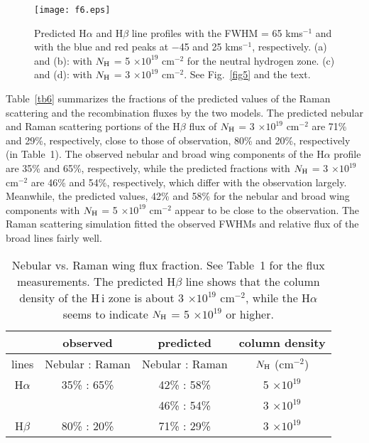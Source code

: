 \documentclass[a4paper,fleqn,usenatbib,useAMS]{mnras}
\def\ha{H{$\alpha$}}
\def\hb{H{$\beta$}}
\def\hi{H\,{\sc i}}
\def\kms{km\hspace{1pt}s$^{-1}$}
\begin{document}
{%

\begin{figure*}
\texttt{[image: f6.eps]}
\caption{Predicted {\ha} and {\hb} line profiles with the FWHM = 65 {\kms} and with the blue and red peaks at $-$45 and 25 {\kms}, respectively. (a) and (b):  with $N_{\rm H}$ =  5 $\times 10^{19}$ cm$^{-2}$ for the neutral hydrogen zone.
(c) and (d): with $N_{\rm H}$  = 3 $\times 10^{19}$ cm$^{-2}$. See Fig.~\ref{fig5} and the text. }
\label{fig6}
\end{figure*}

Table~\ref{tb6} summarizes the fractions of the predicted values of the Raman scattering and the recombination fluxes by the two models. The predicted nebular and Raman scattering portions of the {\hb} flux of $N_{\rm H}$ = 3 $\times 10^{19}$ cm$^{-2}$ are 71\% and 29\%, respectively, close to those of observation, 80\% and 20\%, respectively (in Table~1). The observed nebular and broad wing components of the {\ha} profile are  35\% and 65\%, respectively, while the predicted fractions with  $N_{\rm H}$ = 3 $\times 10^{19}$ cm$^{-2}$ are 46\% and 54\%, respectively, which differ with the observation largely. Meanwhile, the predicted values,  42\% and 58\% for the nebular and broad wing components with $N_{\rm H}$ = 5 $\times 10^{19}$ cm$^{-2}$ appear to be close to the observation.
The Raman scattering simulation fitted the observed FWHMs  and relative flux of the broad lines fairly well.


\begin{table}
\caption{Nebular vs. Raman wing flux fraction.
See Table~1 for  the flux measurements. The predicted {\hb} line shows that  the column density of the {\hi} zone is about 3 $\times 10^{19}$ cm$^{-2}$, while  the {\ha} seems to indicate $N_{\rm H}$  =  5 $\times 10^{19}$ or higher.}
\vspace{-0.5cm}
\begin{tabular}{cccc}\\
\hline \hline

& observed & predicted & column density \\

\hline
lines          &  Nebular  : Raman     &  Nebular  : Raman      &  $N_{\rm H}$ (cm$^{-2}$)  \\
{\ha}           &   35\%  :  65\%      & 42\%  :   58\%          &  5 $\times 10^{19}$  \\
              &                          & 46\%  : 54\%             &  3 $\times 10^{19}$  \\
{\hb}           & 80\% : 20\%           &71\% :  29\%            &  3 $\times 10^{19}$  \\
\hline


\end{tabular}
\end{table}}
\end{document}
